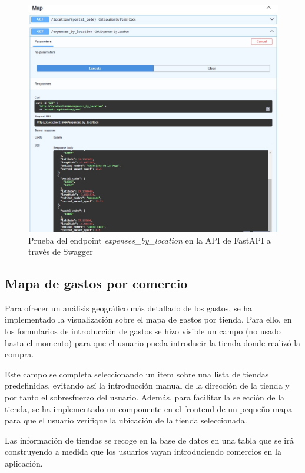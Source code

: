 \begin{figure}[ht!]
    \centering
    \includegraphics[width=\linewidth]{imagenes/api-expenses_by_location.jpg}
    \caption{Prueba del endpoint \textit{expenses\_by\_location} en la API de FastAPI a través de Swagger}
    \label{fig:api-expenses_by_location}
\end{figure}

\subsection{Mapa de gastos por comercio}
Para ofrecer un análisis geográfico más detallado de los gastos, se ha implementado la visualización sobre el mapa de gastos por tienda. Para ello, en los formularios de introducción de gastos se hizo visible un campo (no usado hasta el momento) para que el usuario pueda introducir la tienda donde realizó la compra. 

Este campo se completa seleccionando un item sobre una lista de tiendas predefinidas, evitando así la introducción manual de la dirección de la tienda y por tanto el sobresfuerzo del usuario. Además, para facilitar la selección de la tienda, se ha implementado un componente en el frontend de un pequeño mapa para que el usuario verifique la ubicación de la tienda seleccionada.

Las información de tiendas se recoge en la base de datos en una tabla que se irá construyendo a medida que los usuarios vayan introduciendo comercios en la aplicación.


